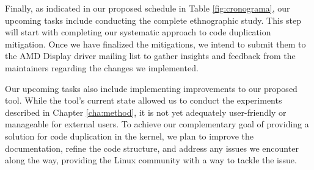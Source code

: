 


Finally, as indicated in our proposed schedule in Table \ref{fig:cronograma}, 
our upcoming tasks include conducting the complete ethnographic study.
This step will start with completing our systematic approach to code 
duplication mitigation. Once we have finalized the mitigations, we intend 
to submit them to the AMD Display driver mailing list to gather insights 
and feedback from the maintainers regarding the changes we implemented.

Our upcoming tasks also include implementing improvements to our proposed tool. 
While the tool’s current state allowed us to conduct the experiments described in 
Chapter \ref{cha:method},
it is not yet adequately user-friendly or manageable for external users. 
To achieve our complementary goal of providing a solution for code duplication 
in the kernel, we plan to improve the documentation, refine the code structure, 
and address any issues we encounter along the way, providing the Linux community 
with a way to tackle the issue.


